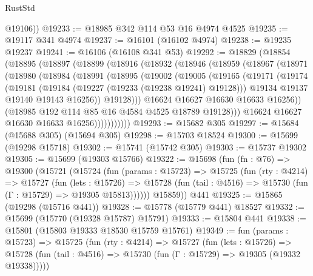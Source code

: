 \begin{lexlean}{RustStd}
\begin{coremodule}
        @19106))
@19233 := @18985 @342 @114 @53 @16 @4974 @4525
@19235 := @19117 @341 @4974
@19237 := @16101 (@16102 @4974)
@19238 := @19235 @19237
@19241 := @16106 (@16108 @341 @53)
@19292 := @18829
    (@18854
      (@18895
        (@18897
          (@18899
            (@18916
              (@18932
                (@18946
                  (@18959
                    (@18967
                      (@18971
                        (@18980
                          (@18984
                            (@18991
                              (@18995
                                (@19002
                                  (@19005
                                    (@19165
                                      (@19171
                                        (@19174
                                          (@19181
                                            (@19184 (@19227 (@19233 (@19238 @19241) @19128)))
                                            @19134
                                            @19137
                                            @19140
                                            @19143
                                            @16256))
                                        @19128)))
                                  @16624
                                  @16627
                                  @16630
                                  @16633
                                  @16256))
                              (@18985 @192 @114 @85 @16 @4584 @4525 @18789 @19128)))
                          @16624
                          @16627
                          @16630
                          @16633
                          @16256)))))))))))
@19293 := @15682 @305
@19297 := @15684 (@15688 @305) (@15694 @305)
@19298 := @15703 @18524
@19300 := @15699 (@19298 @15718)
@19302 := @15741 (@15742 @305)
@19303 := @15737 @19302
@19305 := @15699 (@19303 @15766)
@19322 := @15698
    (fun (fn : @76) =>
    @19300
      (@15721
        (@15724
          (fun (params : @15723) =>
          @15725
            (fun (rty : @4214) =>
            @15727
              (fun (lets : @15726) =>
              @15728 (fun (tail : @4516) => @15730 (fun (Γ : @15729) => @19305 @15813))))))
        @15859))
    @441
@19325 := @15865 (@19298 (@15716 @441))
@19328 := @15778 (@15779 @441) @18527
@19332 := @15699 (@15770 (@19328 @15787) @15791)
@19333 := @15804 @441
@19338 := @15801 (@15803 @19333 @18530 @15759 @15761)
@19349 := fun (params : @15723) =>
  @15725
    (fun (rty : @4214) =>
    @15727
      (fun (lets : @15726) =>
      @15728 (fun (tail : @4516) => @15730 (fun (Γ : @15729) => @19305 (@19332 @19338)))))

\end{coremodule}
\end{lexlean}
